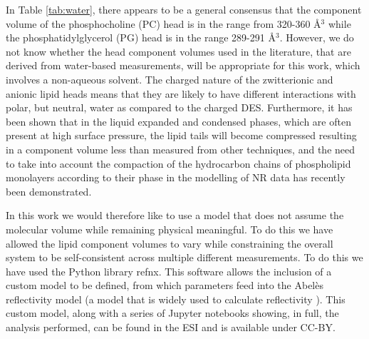 \documentclass[twoside,twocolumn,9pt]{article}
\begin{document}
In Table \ref{tab:water}, there appears to be a general consensus that the component volume of the phosphocholine (PC) head is in the range from 320-360 \AA$^3$ while the phosphatidylglycerol (PG) head is in the range 289-291 \AA$^3$. However, we do not know whether the head component volumes used in the literature, that are derived from water-based measurements, will be appropriate for this work, which involves a non-aqueous solvent. The charged nature of the zwitterionic and anionic lipid heads means that they are likely to have different interactions with polar, but neutral, water as compared to the charged DES.\cite{Sanchez-Fernandez2018} Furthermore, it has been shown that in the liquid expanded and condensed phases, which are often present at high surface pressure, the lipid tails will become compressed resulting in a component volume less than measured from other techniques,\cite{Marsh2010,Small1984} and the need to take into account the compaction of the hydrocarbon chains of phospholipid monolayers according to their phase in the modelling of NR data has recently been demonstrated.\cite{Campbell2018}

In this work we would therefore like to use a model that does not assume the molecular volume while remaining physical meaningful. To do this we have allowed the lipid component volumes to vary while constraining the overall system to be self-consistent across multiple different measurements. To do this we have used the Python library refnx\cite{Nelson2018}. This software allows the inclusion of a custom model to be defined, from which parameters feed into the Abel\`{e}s reflectivity model (a model that is widely used to calculate reflectivity \cite{Abeles1950,Parratt1954}). This custom model, along with a series of Jupyter notebooks showing, in full, the analysis performed, can be found in the ESI and is available under CC-BY.\cite{mccluskey_2018}
\end{document}
